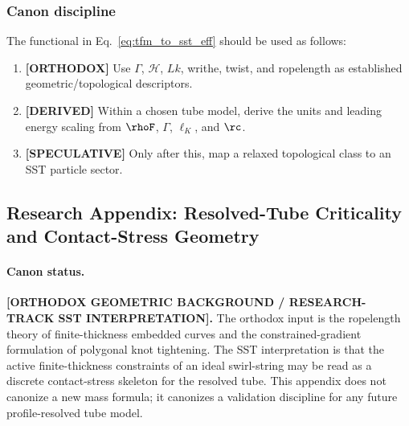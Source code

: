 \subsubsection{Canon discipline}
The functional in Eq.~\eqref{eq:tfm_to_sst_eff} should be used as follows:
\begin{enumerate}
    \item \textbf{[ORTHODOX]} Use $\Gamma$, $\mathcal H$, $Lk$, writhe, twist, and ropelength as established geometric/topological descriptors.
    \item \textbf{[DERIVED]} Within a chosen tube model, derive the units and leading energy scaling from $\rhoF$, $\Gamma$, $\ell_K$, and $\rc$.
    \item \textbf{[SPECULATIVE]} Only after this, map a relaxed topological class to an SST particle sector.
\end{enumerate}

\subsection{Research Appendix: Resolved-Tube Criticality and Contact-Stress Geometry}
\label{app:resolved_tube_contact_stress_geometry}

\paragraph{Canon status.}
\textbf{[ORTHODOX GEOMETRIC BACKGROUND / RESEARCH-TRACK SST INTERPRETATION].}
The orthodox input is the ropelength theory of finite-thickness embedded
curves and the constrained-gradient formulation of polygonal knot tightening.
The SST interpretation is that the active finite-thickness constraints of an
ideal swirl-string may be read as a discrete contact-stress skeleton for the
resolved tube.  This appendix does not canonize a new mass formula; it
canonizes a validation discipline for any future profile-resolved tube model.

